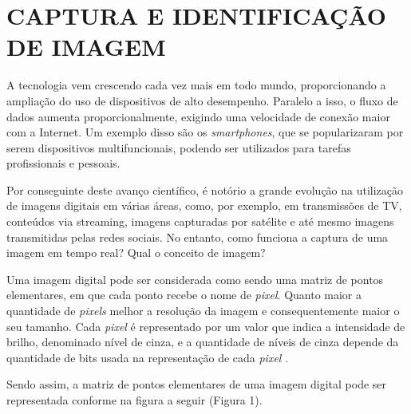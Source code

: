 \section{{CAPTURA E IDENTIFICAÇÃO DE IMAGEM}}

A tecnologia vem crescendo cada vez mais em todo mundo, proporcionando a ampliação do uso de dispositivos de alto desempenho. Paralelo a isso, o fluxo de dados aumenta proporcionalmente, exigindo uma velocidade de conexão maior com a Internet. Um exemplo disso são os \textit{smartphones}, que se popularizaram por serem dispositivos multifuncionais, podendo ser utilizados para tarefas profissionais e pessoais. 

Por conseguinte deste avanço científico, é notório a grande evolução na utilização de imagens digitais em várias áreas, como, por exemplo, em transmissões de TV, conteúdos via streaming, imagens capturadas por satélite e até mesmo imagens transmitidas pelas redes sociais. No entanto, como funciona a captura de uma imagem em tempo real? Qual o conceito de imagem?

Uma imagem digital pode ser considerada como sendo uma matriz de pontos elementares, em que cada ponto recebe o nome de \textit{pixel}. Quanto maior a quantidade de \textit{pixels} melhor a resolução da imagem e consequentemente maior o seu tamanho. Cada \textit{pixel} é representado por um valor que indica a intensidade de brilho, denominado nível de cinza, e a quantidade de níveis de cinza depende da quantidade de bits usada na representação de cada \textit{pixel} \cite{SOUZA2007}.

Sendo assim, a matriz de pontos elementares de uma imagem digital pode ser representada conforme na figura a seguir (Figura 1).


